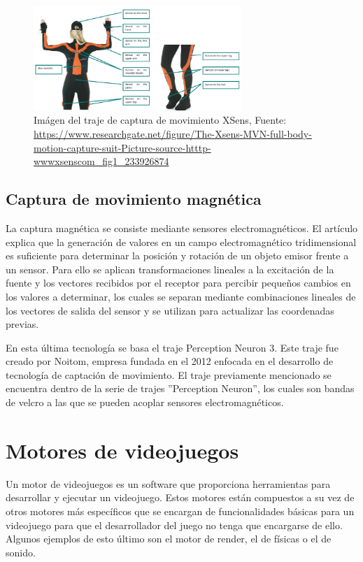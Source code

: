 \begin{figure}[H]
    \centering
    \includegraphics[width=0.7\textwidth]{Imagenes/Bitmap/XSens.png}
    \caption{Imágen del traje de captura de movimiento XSens, Fuente: \url{https://www.researchgate.net/figure/The-Xsens-MVN-full-body-motion-capture-suit-Picture-source-htttp-wwwxsenscom_fig1_233926874}}
    \label{fig:XSensTraje}
\end{figure}

\subsection{Captura de movimiento magnética}
La captura magnética se consiste mediante sensores electromagnéticos.
El artículo \cite{EMS} explica que la generación de valores en un campo electromagnético tridimensional es suficiente para determinar la posición y rotación de un objeto emisor frente a un sensor.
Para ello se aplican transformaciones lineales a la excitación de la fuente y los vectores recibidos por el receptor para percibir pequeños cambios en los valores a determinar, los cuales se separan mediante combinaciones lineales de los vectores de salida del sensor y se utilizan para actualizar las coordenadas previas.

En esta última tecnología se basa el traje Perception Neuron 3.
Este traje fue creado por Noitom, empresa fundada en el 2012 enfocada en el desarrollo de tecnología de captación de movimiento.
El traje previamente mencionado se encuentra dentro de la serie de trajes ''Perception Neuron'', los cuales son bandas de velcro a las que se pueden acoplar sensores electromagnéticos.

\section{Motores de videojuegos}
Un motor de videojuegos es un software que proporciona herramientas para desarrollar y ejecutar un videojuego.
Estos motores están compuestos a su vez de otros motores más específicos que se encargan de funcionalidades básicas para un videojuego para que el desarrollador del juego no tenga que encargarse de ello. Algunos ejemplos de esto último son el motor de render, el de físicas o el de sonido.

